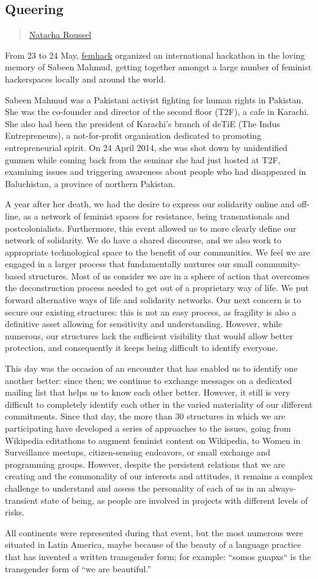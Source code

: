 \subsection{Queering}\label{queering}

\begin{quote}
\href{../appendix/attributions.html\#natacha-roussel}{Natacha Roussel}
\end{quote}

From 23 to 24 May, \href{http://femhack.org/}{femhack} organized an
international hackathon in the loving memory of Sabeen Mahmud, getting
together amongst a large number of feminist hackerspaces locally and
around the world.

Sabeen Mahmud was a Pakistani activist fighting for human rights in
Pakistan. She was the co-founder and director of the second floor (T2F),
a cafe in Karachi. She also had been the president of Karachi's branch
of deTiE (The Indus Entrepreneurs), a not-for-profit organisation
dedicated to promoting entrepreneurial spirit. On 24 April 2014, she was
shot down by unidentified gunmen while coming back from the seminar she
had just hosted at T2F, examining issues and triggering awareness about
people who had disappeared in Baluchistan, a province of northern
Pakistan.

A year after her death, we had the desire to express our solidarity
online and off-line, as a network of feminist spaces for resistance,
being transnationals and postcolonialists. Furthermore, this event
allowed us to more clearly define our network of solidarity. We do have
a shared discourse, and we also work to appropriate technological space
to the benefit of our communities. We feel we are engaged in a larger
process that fundamentally nurtures our small community-based
structures. Most of us consider we are in a sphere of action that
overcomes the deconstruction process needed to get out of a proprietary
way of life. We put forward alternative ways of life and solidarity
networks. Our next concern is to secure our existing structures: this is
not an easy process, as fragility is also a definitive asset allowing
for sensitivity and understanding. However, while numerous, our
structures lack the sufficient visibility that would allow better
protection, and consequently it keeps being difficult to identify
everyone.

This day was the occasion of an encounter that has enabled us to
identify one another better: since then; we continue to exchange
messages on a dedicated mailing list that helps us to know each other
better. However, it still is very difficult to completely identify each
other in the varied materiality of our different commitments. Since that
day, the more than 30 structures in which we are participating have
developed a series of approaches to the issues, going from Wikipedia
editathons to augment feminist content on Wikipedia, to Women in
Surveillance meetups, citizen-sensing endeavors, or small exchange and
programming groups. However, despite the persistent relations that we
are creating and the commonality of our interests and attitudes, it
remains a complex challenge to understand and assess the personality of
each of us in an always-transient state of being, as people are involved
in projects with different levels of risks.

All continents were represented during that event, but the most numerous
were situated in Latin America, maybe because of the beauty of a
language practice that has invented a written transgender form; for
example: ``somos guapxs`` is the transgender form of ``we are
beautiful.''
